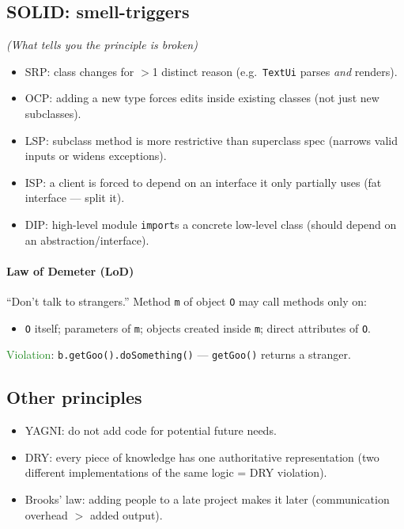 \subsection{SOLID: smell-triggers}
\textit{(What tells you the principle is broken)}
\begin{itemize}
  \item \textcolor{Bittersweet}{SRP}: class changes for $>$1 distinct reason (e.g.\ \texttt{TextUi} parses \textit{and} renders).
  \item \textcolor{Bittersweet}{OCP}: adding a new type forces edits inside existing classes (not just new subclasses).
  \item \textcolor{Bittersweet}{LSP}: subclass method is more restrictive than superclass spec (narrows valid inputs or widens exceptions).
  \item \textcolor{Bittersweet}{ISP}: a client is forced to depend on an interface it only partially uses (fat interface — split it).
  \item \textcolor{Bittersweet}{DIP}: high-level module \texttt{import}s a concrete low-level class (should depend on an abstraction/interface).
\end{itemize}

\paragraph{Law of Demeter (LoD)} \textcolor{Bittersweet}{``Don't talk to strangers.''} Method \texttt{m} of object \texttt{O} may call methods only on:
\begin{itemize}
  \item \texttt{O} itself; parameters of \texttt{m}; objects created inside \texttt{m}; direct attributes of \texttt{O}.
\end{itemize}
\textcolor{ForestGreen}{Violation}: \texttt{b.getGoo().doSomething()} — \texttt{getGoo()} returns a stranger.

\subsection{Other principles}
\begin{itemize}
  \item \textcolor{Bittersweet}{YAGNI}: do not add code for potential future needs.
  \item \textcolor{Bittersweet}{DRY}: every piece of knowledge has one authoritative representation (two different implementations of the same logic = DRY violation).
  \item \textcolor{Bittersweet}{Brooks' law}: adding people to a late project makes it later (communication overhead $>$ added output).
\end{itemize}

